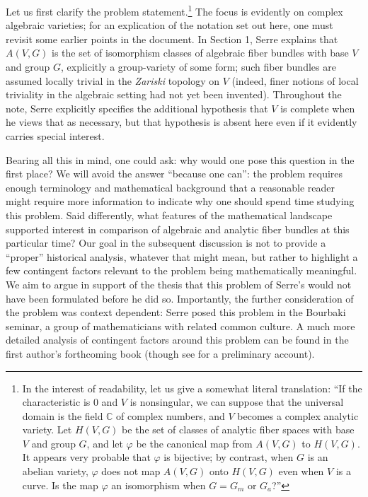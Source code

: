 \documentclass[11pt,leqno]{article}
\newcommand{\cplx}{{\mathbb C}}
\renewcommand{\1}{{\rm 1\hspace*{-0.4ex}%
\rule{0.1ex}{1.52ex}\hspace*{0.2ex}}}
\newcommand{\<}[1]{{\langle}#1 {\rangle}}
\theoremstyle{plain}
\theoremstyle{definition}
\theoremstyle{remark}
\numberwithin{equation}{subsection}
\begin{document}
Let us first clarify the problem statement.\footnote{In the interest of readability, let us give a somewhat literal translation: ``If the characteristic is $0$ and $V$ is nonsingular, we can suppose that the universal domain is the field $\cplx$ of complex numbers, and $V$ becomes a complex analytic variety.  Let $H(V,G)$ be the set of classes of analytic fiber spaces with base $V$ and group $G$, and let $\varphi$ be the canonical map from $A(V,G)$ to $H(V,G)$.  It appears very probable that $\varphi$ is bijective; by contrast, when $G$ is an abelian variety, $\varphi$ does not map $A(V,G)$ onto $H(V,G)$ even when $V$ is a curve.  Is the map $\varphi$ an isomorphism when $G = G_m$ or $G_a$?''}  The focus is evidently on complex algebraic varieties; for an explication of the notation set out here, one must revisit some earlier points in the document.  In Section 1, Serre explains that $A(V,G)$ is the set of isomorphism classes of algebraic fiber bundles with base $V$ and group $G$, explicitly a group-variety of some form; such fiber bundles are assumed locally trivial in the {\em Zariski} topology on $V$ (indeed, finer notions of local triviality in the algebraic setting had not yet been invented).  Throughout the note, Serre explicitly specifies the additional hypothesis that $V$ is complete when he views that as necessary, but that hypothesis is absent here even if it evidently carries special interest.  

Bearing all this in mind, one could ask: why would one pose this question in the first place?  We will avoid the answer ``because one can'': the problem requires enough terminology and mathematical background that a reasonable reader might require more information to indicate why one should spend time studying this problem.  Said differently, what features of the mathematical landscape supported interest in comparison of algebraic and analytic fiber bundles at this particular time?  Our goal in the subsequent discussion is not to provide a ``proper'' historical analysis, whatever that might mean, but rather to highlight a few contingent factors relevant to the problem being mathematically meaningful.  We aim to argue in support of the thesis that this problem of Serre's would not have been formulated before he did so.  Importantly, the further consideration of the problem was context dependent: Serre posed this problem in the Bourbaki seminar, a group of mathematicians with related common culture.  A much more detailed analysis of contingent factors around this problem can be found in the first author's forthcoming book (though see \cite{Asok} for a preliminary account). 
\end{document}
